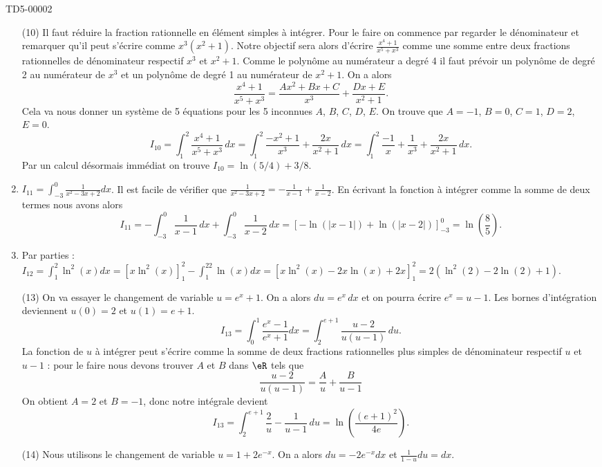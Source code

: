 \begin{corrige}{TD5-00002}
\begin{enumerate}
    \item[(10)]  Il faut réduire la fraction rationnelle en élément simples à intégrer. Pour le faire on commence par regarder le dénominateur et remarquer qu'il peut s'écrire comme $x^3 (x^2 + 1)$. Notre objectif sera alors d'écrire $\frac{x^4+1}{x^5+x^3}$ comme une somme entre deux fractions rationnelles de dénominateur respectif $x^3$ et $x^2+1$. Comme le polyn\^ome au numérateur a degré 4 il faut prévoir un polyn\^ome de degré 2 au numérateur de $x^3$ et un  polyn\^ome de degré 1 au numérateur de $x^2+1$. On a alors 
      \[
      \frac{x^4+1}{x^5+x^3} = \frac{Ax^2+Bx + C}{x^3} +\frac{Dx+E}{x^2+1}. 
      \]
      Cela va nous donner un système de 5 équations pour les 5 inconnues $A$, $B$, $C$, $D$, $E$. On trouve que $A = -1$, $B = 0$, $C =1$, $D = 2$, $E = 0$. 
      \[
      I_{10}=\int_{1}^{2}\frac{x^4+1}{x^5+x^3}\, dx  = \int_{1}^{2}\frac{-x^2+1}{x^3} +\frac{2x}{x^2+1}\, dx  =\int_{1}^{2}\frac{-1}{x} +\frac{1}{x^3} +\frac{2x}{x^2+1}\, dx .
      \]
      Par un calcul désormais immédiat on trouve $I_{10}= \ln(5/4) + 3/8$.
    \item $\displaystyle I_{11}=\int_{-3}^0\frac{1}{ x^2-3x+2 }dx$. Il est facile de vérifier que $\frac{1}{ x^2-3x+2 } =- \frac{ 1}{ x-1 }+\frac{ 1}{ x-2 }$. En écrivant la fonction à intégrer comme la somme de deux termes nous avons alors 
\[
I_{11}=-\int_{-3}^0\frac{ 1}{ x-1 }\,dx+\int_{-3}^0\frac{ 1}{ x-2 }\,dx = \left[-\ln(|x-1|)+\ln(|x-2|)\right]_{-3}^0 = \ln\left(\frac{8}{5}\right).
\]
    \item Par parties : $\displaystyle I_{12}=\int_1^2\ln^2(x)dx =\left[x\ln^2(x)\right]_{1}^2 - \int_1^22\ln(x)dx = \left[x\ln^2(x)-2x\ln(x) + 2x\right]_{1}^2 = 2\left(\ln^2(2)-2\ln(2) + 1\right) $.
    \item[(13)]  On va essayer le changement de variable $u= e^x+1 $. On a alors $du = e^x \,dx$ et on pourra écrire $e^x = u-1$. Les bornes d'intégration deviennent $u(0) = 2$ et $u(1) = e + 1$.
      \[
      I_{13}=\int_0^1\frac{ e^x-1 }{ e^x+1 }dx = \int_2^{e+1}\frac{u-2}{u(u-1)} \, du.
      \]
      La fonction de $u$ à intégrer peut s'écrire comme la somme de deux fractions rationnelles plus simples de dénominateur respectif $u$ et $u-1$ : pour le faire nous devons trouver $A$ et $B$ dans $\eR$ tels que 
      \[
      \frac{u-2}{u(u-1)} = \frac{A}{u} +\frac{B}{u-1} 
      \]
      On obtient $A=2$ et $B= -1$, donc notre intégrale devient 
      \[
      I_{13}=\int_2^{e+1} \frac{2}{u} -\frac{1}{u-1}\, du = \ln\left(\frac{(e+1)^2}{4e}\right).
      \]
    \item[(14)] Nous utilisons le changement de variable $u= 1+2e^{-x}$. On a alors $du = -2e^{-x} dx$  et $\frac{1}{1-u}du = dx$.  

\end{enumerate}
\end{corrige}
